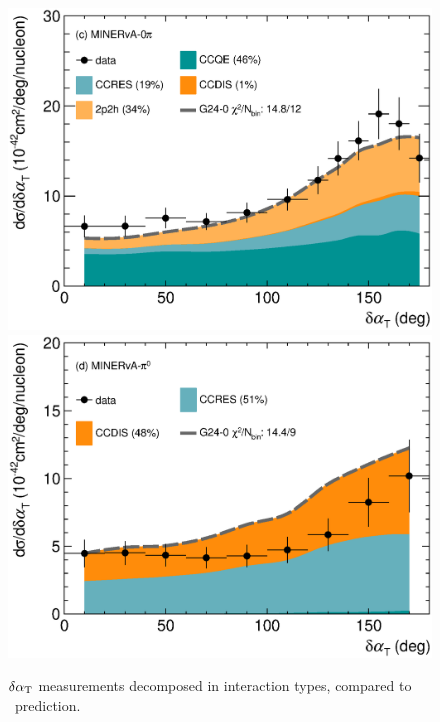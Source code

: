 \begin{figure}
    \includegraphics[width=\dbfigwid\textwidth]{figures/tuning/0000-min_0pi_dalphat_reac_decomp.eps} 
    \includegraphics[width=\dbfigwid\textwidth]{figures/tuning/0000-min_pi0_dalphat_reac_decomp.eps}
    \caption{$\delta\alpha_\textrm{T}$ measurements decomposed in interaction types, compared to \gZero\ prediction.}   \label{fig:g24-0-dat-reac} 
            

\end{figure}
